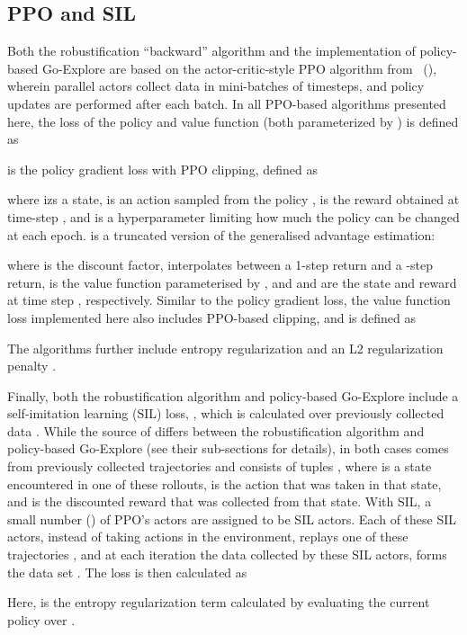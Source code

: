 \documentclass{nature}
\renewcommand*{\cite}[1]{\supercite{#1}}
\newcommand{\citefull}[1]{\citeauthor{#1}~(\citeyear{#1})\cite{#1}}
\begin{document}
\subsection{PPO and SIL}

Both the robustification ``backward'' algorithm and the implementation of policy-based Go-Explore are based on the actor-critic-style PPO algorithm from \citefull{Schulman2017ProximalPO}, wherein  parallel actors collect data in mini-batches of  timesteps, and policy updates are performed after each batch. 
In all PPO-based algorithms presented here, the loss of the policy and value function (both parameterized by ) is defined as

 is the policy gradient loss with PPO clipping, defined as


where  izs a state,  is an action sampled from the policy ,  is the reward obtained at time-step , and  is a hyperparameter limiting how much the policy can be changed at each epoch.
 is a truncated version of the generalised advantage estimation:


where  is the discount factor,  interpolates between a 1-step return and a -step return,  is the value function parameterised by , and  and  are the state and reward at time step , respectively. 
Similar to the policy gradient loss, the value function loss  implemented here also includes PPO-based clipping, and is defined as


The algorithms further include entropy regularization\cite{o2016combining}  and an L2 regularization penalty .

Finally, both the robustification algorithm and policy-based Go-Explore include a self-imitation learning (SIL) loss\cite{Oh2018SelfImitationL}, , which is calculated over previously collected data . 
While the source of  differs between the robustification algorithm and policy-based Go-Explore (see their sub-sections for details), in both cases  comes from previously collected trajectories  and consists of tuples , where  is a state encountered in one of these rollouts,  is the action that was taken in that state, and  is the discounted reward that was collected from that state.
With SIL, a small number () of PPO's actors are assigned to be SIL actors.
Each of these SIL actors, instead of taking actions in the environment, replays one of these trajectories , and at each iteration the data collected by these SIL actors, forms the data set .
The  loss is then calculated as




\noindent
Here,  is the entropy regularization term\cite{o2016combining} calculated by evaluating the current policy over .
\end{document}

